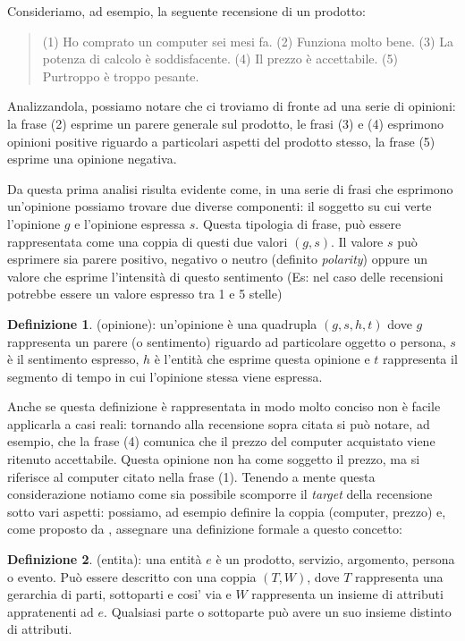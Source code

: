 \documentclass[a4paper,12pt,openright,twoside]{report}
\theoremstyle{definition}
\newtheorem{defi}{Definizione}[section]
\begin{document}
Consideriamo, ad esempio, la seguente recensione di un prodotto:
\begin{quote}
(1) Ho comprato un computer sei mesi fa. (2) Funziona molto bene. (3) La potenza
di calcolo è soddisfacente. (4) Il prezzo è accettabile. (5) Purtroppo è troppo pesante.
\end{quote}
Analizzandola, possiamo notare che ci troviamo di fronte ad una serie di opinioni: la frase (2) esprime un 
parere generale sul prodotto, le frasi (3) e (4) esprimono opinioni positive riguardo
a particolari aspetti del prodotto stesso, la frase (5) esprime una opinione negativa.

Da questa prima analisi risulta evidente come, in una serie di frasi che esprimono un'opinione 
possiamo trovare due diverse componenti:
il soggetto su cui verte l'opinione $g$ e l'opinione espressa $s$.
Questa tipologia di frase, può essere rappresentata come una coppia di questi due valori $(g,s)$.
Il valore $s$ può esprimere sia parere positivo, negativo o neutro (definito \emph{polarity}) oppure un valore che 
esprime l'intensità di questo sentimento (Es: nel caso delle recensioni potrebbe
essere un valore espresso tra 1 e 5 stelle)

\begin{defi}(opinione): un'opinione è una quadrupla $(g, s, h, t)$ dove $g$ rappresenta un parere
(o sentimento) riguardo ad particolare oggetto o persona, $s$ è il sentimento espresso,
$h$ è l'entità che esprime questa opinione e $t$ rappresenta il segmento  di tempo in cui
l'opinione stessa viene espressa.
\end{defi}

Anche se questa definizione è rappresentata in modo molto conciso non è facile applicarla
a casi reali: tornando alla recensione sopra citata si può notare, ad esempio, che
la frase (4) comunica che il prezzo del computer acquistato viene ritenuto 
accettabile. Questa opinione non ha come soggetto il prezzo, ma si riferisce al computer
citato nella frase (1). Tenendo a mente questa considerazione notiamo come
sia possibile scomporre il \emph{target} della recensione sotto vari aspetti: possiamo, ad esempio
definire la coppia (computer, prezzo) e, come proposto da \cite{Hu2004},
assegnare una definizione formale a questo concetto:

\begin{defi}(entita): una entità $e$ è un prodotto, servizio, argomento, persona o evento.
Può essere descritto con una coppia $(T,W)$, dove $T$ rappresenta una gerarchia di parti, sottoparti 
e cosi' via e $W$ rappresenta un insieme di attributi appratenenti ad $e$. Qualsiasi parte o sottoparte può
avere un suo insieme distinto di attributi.
\end{defi}
\end{document}
